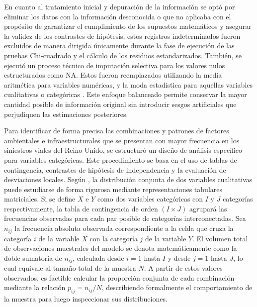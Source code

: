 \documentclass[12pt]{article}
\begin{document}
En cuanto al tratamiento inicial y depuración de la información se optó por eliminar 
los datos con la información desconocida o que no aplicaba con el propósito de garantizar 
el cumplimiento de los supuestos matemáticos y asegurar la validez de los contrastes de 
hipótesis, estos registros indeterminados fueron excluidos de manera dirigida únicamente 
durante la fase de ejecución de las pruebas Chi-cuadrado y el cálculo de los residuos 
estandarizados.  También, se ejecutó un proceso técnico de imputación selectiva para los 
valores nulos estructurados como NA. Estos fueron reemplazados utilizando la media aritmética 
para variables numéricas, y la moda estadística para aquellas variables cualitativas o 
categóricas \parencite{USECHE2006}. Este enfoque balanceado permite conservar la mayor cantidad posible de 
información original sin introducir sesgos artificiales que perjudiquen las estimaciones 
posteriores.

Para identificar de forma precisa las combinaciones y patrones de factores ambientales 
e infraestructurales que se presentan con mayor frecuencia en los siniestros viales del 
Reino Unido, se estructuró un diseño de análisis específico para variables categóricas. 
Este procedimiento se basa en el uso de tablas de contingencia, contrastes de hipótesis 
de independencia y la evaluación de desviaciones locales. Según \textcite{LASTRE2019}, la 
distribución conjunta de dos variables cualitativas puede estudiarse de forma rigurosa 
mediante representaciones tabulares matriciales. Si se define $X$ e $Y$ como dos variables 
categóricas con $I$ y $J$ categorías respectivamente, la tabla de contingencia de orden 
$(I \times J)$ agrupará las frecuencias observadas para cada par posible de categorías 
interconectadas. Sea $n_{ij}$ la frecuencia absoluta observada correspondiente a la celda 
que cruza la categoría $i$ de la variable $X$ con la categoría $j$ de la variable $Y$. 
El volumen total de observaciones muestrales del modelo se denota matemáticamente como 
la doble sumatoria de $n_{ij}$, calculada desde $i=1$ hasta $I$ y desde $j=1$ hasta $J$, 
lo cual equivale al tamaño total de la muestra $N$. A partir de estos valores observados, 
es factible calcular la proporción conjunta de cada combinación mediante la relación 
$p_{ij} = n_{ij} / N$, describiendo formalmente el comportamiento de la muestra para 
luego inspeccionar sus distribuciones.
\end{document}
